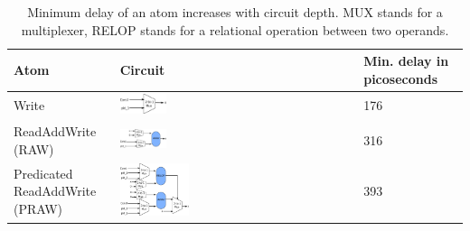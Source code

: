 \begin{table}[!t]
  \begin{scriptsize}
    \begin{tabular}{|p{}|p{}|p{}|}
  \hline
  Atom & Circuit & Min. delay in picoseconds \\
  \hline
  Write & \includegraphics[width=0.2\textwidth]{rw.pdf} & 176 \\
  \hline
  ReadAddWrite (RAW) & \includegraphics[width=0.2\textwidth]{raw.pdf} & 316\\
  \hline
  \pbox{0.1\textwidth}
  {Predicated\\
  ReadAddWrite (PRAW)} & \includegraphics[width=0.3\textwidth]{pred_raw.pdf}  & 393 \\
  \hline
  \end{tabular}
\end{scriptsize}
\caption{Minimum delay of an atom increases with circuit depth. MUX
stands for a multiplexer, RELOP stands for a relational operation between two
operands.}
\label{tab:circuits}
\end{table}
